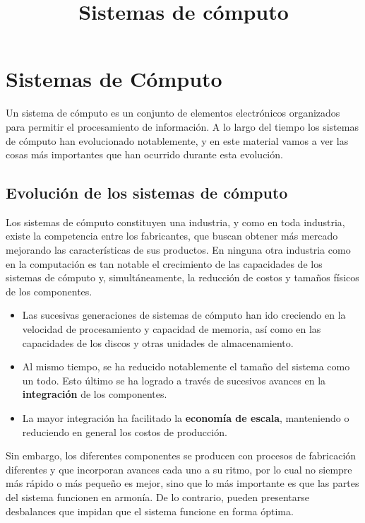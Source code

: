 \documentclass[spanish,a4paper,]{article}
\title{Sistemas de cómputo}
\date{}
\providecommand{\tightlist}{%
  \setlength{\itemsep}{0pt}\setlength{\parskip}{0pt}}
\begin{document}
\maketitle

\hypertarget{sistemas-de-cuxf3mputo}{%
\section{Sistemas de Cómputo}\label{sistemas-de-cuxf3mputo}}

Un sistema de cómputo es un conjunto de elementos electrónicos
organizados para permitir el procesamiento de información. A lo largo
del tiempo los sistemas de cómputo han evolucionado notablemente, y en
este material vamos a ver las cosas más importantes que han ocurrido
durante esta evolución.

\hypertarget{evoluciuxf3n-de-los-sistemas-de-cuxf3mputo}{%
\subsection{Evolución de los sistemas de
cómputo}\label{evoluciuxf3n-de-los-sistemas-de-cuxf3mputo}}

Los sistemas de cómputo constituyen una industria, y como en toda
industria, existe la competencia entre los fabricantes, que buscan
obtener más mercado mejorando las características de sus productos. En
ninguna otra industria como en la computación es tan notable el
crecimiento de las capacidades de los sistemas de cómputo y,
simultáneamente, la reducción de costos y tamaños físicos de los
componentes.

\begin{itemize}
\tightlist
\item
  Las sucesivas generaciones de sistemas de cómputo han ido creciendo en
  la velocidad de procesamiento y capacidad de memoria, así como en las
  capacidades de los discos y otras unidades de almacenamiento.
\item
  Al mismo tiempo, se ha reducido notablemente el tamaño del sistema
  como un todo. Esto último se ha logrado a través de sucesivos avances
  en la \textbf{integración} de los componentes.
\item
  La mayor integración ha facilitado la \textbf{economía de escala},
  manteniendo o reduciendo en general los costos de producción.
\end{itemize}

Sin embargo, los diferentes componentes se producen con procesos de
fabricación diferentes y que incorporan avances cada uno a su ritmo, por
lo cual no siempre más rápido o más pequeño es mejor, sino que lo más
importante es que las partes del sistema funcionen en armonía. De lo
contrario, pueden presentarse desbalances que impidan que el sistema
funcione en forma óptima.
\end{document}
